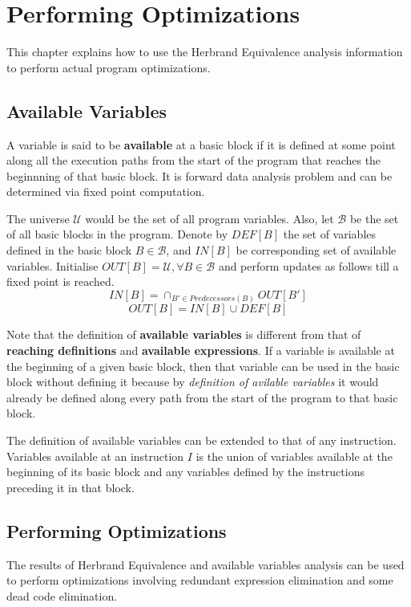 \chapter{Performing Optimizations}
\label{chap:chapter8}

This chapter explains how to use the Herbrand Equivalence analysis
information to perform actual program optimizations.

\section{Available Variables}
\label{AvailableVariables}
A variable is said to be \textbf{available} at a basic block if 
it is defined at some point along all the execution paths from the 
start of the program that reaches the beginnning of that basic block.
It is forward data analysis problem and can be determined via fixed 
point computation.

The universe $\mathcal U$ would be the set of all program variables.
Also, let $\mathcal B$ be the set of all basic blocks in the program.
Denote by $DEF[B]$ the set of variables defined in the basic block
$B \in \mathcal B$, and $IN[B]$ be corresponding set of available 
variables. Initialise $OUT[B] = \mathcal U, \forall B \in \mathcal B$ 
and perform updates as follows till a fixed point is reached.
$$IN[B] = \cap_{B' \in Predecessors(B)} OUT[B']$$
$$OUT[B] = IN[B] \cup DEF[B]$$

Note that the definition of \textbf{available variables} is different
from that of \textbf{reaching definitions} and \textbf{available 
expressions}. If a variable is available at the beginning of a given
basic block, then that variable can be used in the basic block without
defining it because by \textit{definition of avilable variables} it 
would already be defined along every path from the start of the 
program to that basic block.

The definition of available variables can be extended to that of any
instruction. Variables available at an instruction $I$ is the union 
of variables available at the beginning of its basic block and any 
variables defined by the instructions preceding it in that block.

\section{Performing Optimizations}
\label{PerformingOptimizations}
The results of Herbrand Equivalence and available variables analysis 
can be used to perform optimizations involving redundant expression 
elimination and some dead code elimination.

